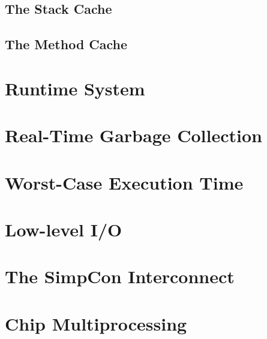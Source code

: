 \clearpage
    \section{The Stack Cache}
    \label{sec:stack}
    

\clearpage
    \section{The Method Cache}
    \label{sec:cache}
    

\chapter{Runtime System}
\label{chap:runtime}

    
    
%    
    
\clearpage
    
    

\chapter{Real-Time Garbage Collection}
\label{chap:rtgc}
    

\chapter{Worst-Case Execution Time}
\label{chap:wcet}
    

\chapter{Low-level I/O}
\label{chap:io}
    

\chapter{The SimpCon Interconnect}
\label{chap:simpcon}
\newcommand{\scgrsc}{.65}
\newcommand{\scgrp}{simpcon}



\chapter{Chip Multiprocessing}
\label{chap:cmp}



%

